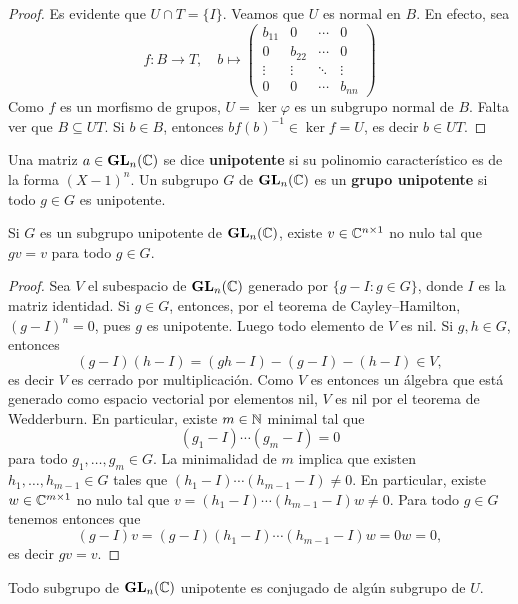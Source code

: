 \begin{proof}
Es evidente que $U\cap T=\{I\}$. Veamos que $U$ es normal en $B$. En efecto, sea 
\[
f\colon B\to T,\quad b\mapsto\begin{pmatrix}
b_{11} & 0 & \cdots & 0\\
0 & b_{22} & \cdots & 0\\
\vdots & \vdots & \ddots & \vdots\\
0 & 0 & \cdots & b_{nn}	
\end{pmatrix}
\]
Como $f$ es un morfismo de grupos, $U=\ker\varphi$ es un subgrupo normal de $B$. Falta ver que 
$B\subseteq UT$. Si $b\in B$, entonces
$bf(b)^{-1}\in\ker f=U$, es decir 
$b\in UT$. 
\end{proof}

Una matriz $a\in\mathbf{GL}_n(\mathbb{C})$ se dice \textbf{unipotente} si su polinomio característico es de la forma $(X-1)^n$. Un subgrupo
$G$ de $\mathbf{GL}_n(\mathbb{C})$ es un \textbf{grupo unipotente} si todo $g\in G$ es unipotente.  

\begin{proposition}
	Si $G$ es un subgrupo unipotente de $\mathbf{GL}_n(\mathbb{C})$, existe 
	$v\in \mathbb{C}^{n\times 1}$ no nulo tal que $gv=v$ para todo $g\in G$.  
\end{proposition}

\begin{proof}
	Sea $V$ el subespacio de $\mathbf{GL}_n(\mathbb{C})$ generado por $\{g-I:g\in G\}$, 
	donde $I$ es la matriz identidad. Si $g\in G$, entonces, por el teorema de Cayley--Hamilton, 
	$(g-I)^n=0$, pues $g$ es unipotente. Luego todo elemento de $V$ es nil. 
	Si $g,h\in G$, entonces
	\[
	(g-I)(h-I)=(gh-I)-(g-I)-(h-I)\in V, 
	\]
	es decir $V$ es cerrado por multiplicación. Como $V$ es entonces un álgebra que 
	está generado como espacio
	vectorial por elementos nil, $V$ es nil por el teorema de Wedderburn. En particular,
	existe $m\in\mathbb{N}$ minimal tal que 
	\[
	(g_1-I)\cdots (g_m-I)=0
	\]
	para todo $g_1,\dots,g_m\in G$. 
	La minimalidad de $m$ implica que existen $h_1,\dots,h_{m-1}\in G$ tales que 
	$(h_1-I)\cdots (h_{m-1}-I)\ne 0$. En particular, existe $w\in \mathbb{C}^{m\times 1}$ no nulo tal que
	$v=(h_1-I)\cdots (h_{m-1}-I)w\ne 0$. Para todo $g\in G$ tenemos entonces
	que \[
	(g-I)v=(g-I)(h_1-I)\cdots (h_{m-1}-I)w=0w=0,
	\]
	es decir 
	$gv=v$. 
\end{proof}

\begin{theorem}[Kolchin]
Todo subgrupo de $\mathbf{GL}_n(\mathbb{C})$ unipotente es conjugado de algún subgrupo de $U$.	
\end{theorem}

